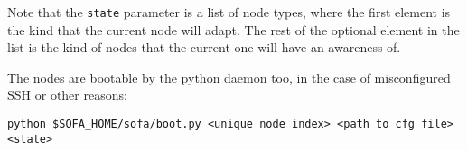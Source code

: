 Note that the \texttt{state} parameter is a list of node types, where the first element is the kind that the current node will adapt. The rest of the optional element in the list is the kind of nodes that the current one will have an awareness of.
\newline

The nodes are bootable by the python daemon too, in the case of misconfigured SSH or other reasons:
\vspace*{2mm}

\begin{lstlisting}[numbers=none, backgroundcolor=\color{sourcebackground}, rulecolor=\color{sourcebackground}, framextopmargin=5pt, framexbottommargin=5pt, frame=tb, xrightmargin=15pt, commentstyle=\color{bashcommetcolor}, showstringspaces=false, deletendkeywords={file, list}]
	python $SOFA_HOME/sofa/boot.py <unique node index> <path to cfg file> <state>
\end{lstlisting}	